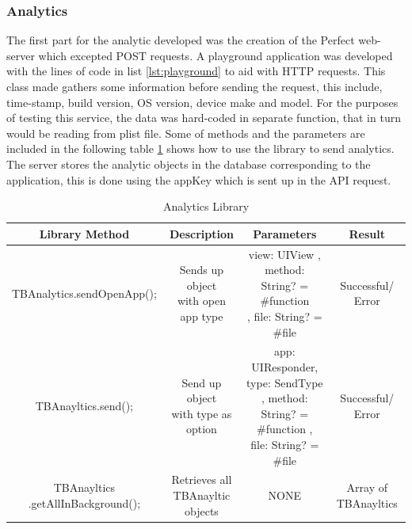 \subsubsection{Analytics}

The first part for the analytic developed was the creation of the Perfect web-server which excepted POST requests. A playground application was developed with the lines of code in list \ref{lst:playground} to aid with HTTP requests. This class made gathers some information before sending the request, this include, time-stamp, build version, OS version, device make and model. For the purposes of testing this service, the data was hard-coded in separate function, that in turn would be reading from plist file. Some of methods and the parameters are included in the following table \ref{table:mob_analytics} shows how to use the library to send analytics. The server stores the analytic objects in the database corresponding to the application, this is done using the appKey which is sent up in the API request.

\begin{table}[!h]
\centering
\caption{Analytics Library}
\label{table:mob_analytics}
\begin{tabular}{|c|c|c|c|}
\hline
\rowcolor{green!20}
Library Method                    & Description                        & Parameters    & Result              \\ 
\hline
TBAnalytics.sendOpenApp();        & \makecell{Sends up object\\ with open app type} &   \makecell{view: UIView , \\ method: String? = \#function \\ , file: String? = \#file } & Successful/ Error   \\ 
\hline
TBAnayltics.send();               & \makecell{Send up object \\ with type as option} &  \makecell{ app: UIResponder, \\ type: SendType \\ , method: String? = \#function ,  \\ file: String? = \#file } & Successful/ Error   \\ 
\hline
 \makecell{ TBAnayltics \\.getAllInBackground(); } & \makecell{Retrieves all \\ TBAnayltic objects }   & NONE        & Array of TBAnayltics \\ 
\hline
\end{tabular}%
\end{table}

